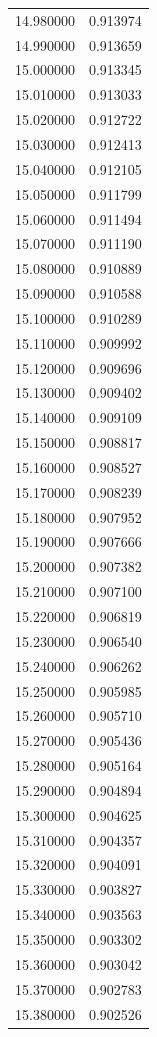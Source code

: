 \begin{tabular}{rr}
14.980000 & 0.913974 \\
14.990000 & 0.913659 \\
15.000000 & 0.913345 \\
15.010000 & 0.913033 \\
15.020000 & 0.912722 \\
15.030000 & 0.912413 \\
15.040000 & 0.912105 \\
15.050000 & 0.911799 \\
15.060000 & 0.911494 \\
15.070000 & 0.911190 \\
15.080000 & 0.910889 \\
15.090000 & 0.910588 \\
15.100000 & 0.910289 \\
15.110000 & 0.909992 \\
15.120000 & 0.909696 \\
15.130000 & 0.909402 \\
15.140000 & 0.909109 \\
15.150000 & 0.908817 \\
15.160000 & 0.908527 \\
15.170000 & 0.908239 \\
15.180000 & 0.907952 \\
15.190000 & 0.907666 \\
15.200000 & 0.907382 \\
15.210000 & 0.907100 \\
15.220000 & 0.906819 \\
15.230000 & 0.906540 \\
15.240000 & 0.906262 \\
15.250000 & 0.905985 \\
15.260000 & 0.905710 \\
15.270000 & 0.905436 \\
15.280000 & 0.905164 \\
15.290000 & 0.904894 \\
15.300000 & 0.904625 \\
15.310000 & 0.904357 \\
15.320000 & 0.904091 \\
15.330000 & 0.903827 \\
15.340000 & 0.903563 \\
15.350000 & 0.903302 \\
15.360000 & 0.903042 \\
15.370000 & 0.902783 \\
15.380000 & 0.902526 \\

\end{tabular}
